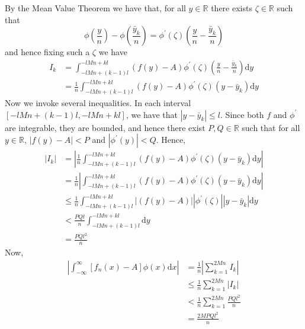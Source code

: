 \documentclass{article}
\begin{document}
%
By the Mean Value Theorem we have that, for all $y \in \mathbb{R}$ there
exists $\zeta \in \mathbb{R}$ such that
%
\begin{equation*}
    \phi\left(\frac{y}{n}\right) - \phi\left(\frac{\bar{y}_k}{n}\right)
        = \phi^\prime(\zeta) \left( \frac{y}{n} - \frac{\bar{y}_k}{n} \right)
\end{equation*}
%
and hence fixing such a $\zeta$ we have
%
\begin{align*}
    I_k &= \int_{-l M n + (k - 1) l}^{- l M n + k l}
            \left( f(y) - A \right) \phi^\prime(\zeta) \left( \frac{y}{n} - \frac{\bar{y}_k}{n} \right)
           \mathrm{d} y \\
        &= \frac{1}{n} \int_{-l M n + (k - 1) l}^{- l M n + k l}
            \left( f(y) - A \right) \phi^\prime(\zeta) \left( y - \bar{y}_k \right)
           \mathrm{d} y
\end{align*}
%
Now we invoke several inequalities. In each interval
$[- l M n + (k - 1) l, - l M n + k l]$, we have that $|y - \bar{y}_k| \leq l$.
Since both $f$ and $\phi^\prime$ are integrable, they are bounded, and
hence there exist $P, Q \in \mathbb{R}$ such that for all
$y \in \mathbb{R}$, $|f(y) - A| < P$ and $|\phi^\prime(y)| < Q$.
%
Hence,
%
\begin{align*}
    |I_k| &= \left|
                \frac{1}{n} \int_{-l M n + (k - 1) l}^{- l M n + k l}
                 \left( f(y) - A \right) \phi^\prime(\zeta) \left( y - \bar{y}_k \right)
                \mathrm{d} y
             \right| \\
          &= \frac{1}{n} \left|
                \int_{-l M n + (k - 1) l}^{- l M n + k l}
                 \left( f(y) - A \right) \phi^\prime(\zeta) \left( y - \bar{y}_k \right)
                \mathrm{d} y
             \right| \\
          &\leq \frac{1}{n}
                \int_{-l M n + (k - 1) l}^{- l M n + k l}
                 \left| \left( f(y) - A \right) \right|
                 \left| \phi^\prime(\zeta) \right|
                 \left| y - \bar{y}_k \right|
                \mathrm{d} y \\
          &< \frac{P Q l}{n}
                \int_{-l M n + (k - 1) l}^{- l M n + k l}
                \mathrm{d} y \\
          &= \frac{P Q l^2}{n}
\end{align*}
%
Now,
%
\begin{align*}
    \left| \int_{-\infty}^{\infty} \left[ f_n(x) - A \right] \phi(x) \mathrm{d} x \right|
        &= \frac{1}{n} \left| \sum_{k = 1}^{2 M n} I_k \right| \\
        &\leq \frac{1}{n} \sum_{k = 1}^{2 M n} |I_k| \\
        &< \frac{1}{n} \sum_{k = 1}^{2 M n} \frac{P Q l^2}{n} \\
        &= \frac{2 M P Q l^2}{n}
\end{align*}
\end{document}

